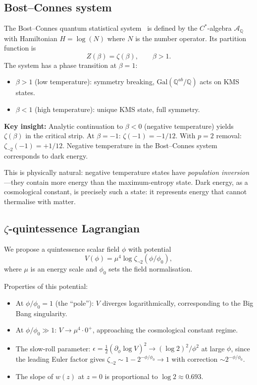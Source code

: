 \documentclass[12pt,a4paper]{article}
\theoremstyle{definition}
\newcommand{\Gal}{\mathrm{Gal}}
\newcommand{\Q}{\mathbb{Q}}
\newcommand{\zetanot}{\zeta_{\neg 2}}
\begin{document}
\subsection{Bost--Connes system}

The Bost--Connes quantum statistical system~\cite{BostConnes} is defined by
the $C^*$-algebra $\mathcal{A}_\Q$ with Hamiltonian $H=\log(N)$ where $N$
is the number operator.  Its partition function is
\[
  Z(\beta)=\zeta(\beta),\qquad \beta>1.
\]
The system has a phase transition at $\beta=1$:
\begin{itemize}
\item $\beta>1$ (low temperature): symmetry breaking, $\Gal(\Q^{ab}/\Q)$ acts
  on KMS states.
\item $\beta<1$ (high temperature): unique KMS state, full symmetry.
\end{itemize}

\textbf{Key insight:} Analytic continuation to $\beta<0$ (negative temperature)
yields $\zeta(\beta)$ in the critical strip.  At $\beta=-1$:
$\zeta(-1)=-1/12$.  With $p=2$ removal: $\zetanot(-1)=+1/12$.
Negative temperature in the Bost--Connes system corresponds to dark energy.

This is physically natural: negative temperature states have \emph{population
inversion}---they contain more energy than the maximum-entropy state.
Dark energy, as a cosmological constant, is precisely such a state:
it represents energy that cannot thermalise with matter.

\subsection{$\zeta$-quintessence Lagrangian}

We propose a quintessence scalar field $\phi$ with potential
\[
  V(\phi)=\mu^4\log\zetanot(\phi/\phi_0),
\]
where $\mu$ is an energy scale and $\phi_0$ sets the field normalisation.

Properties of this potential:
\begin{itemize}
\item At $\phi/\phi_0=1$ (the ``pole''): $V$ diverges logarithmically,
  corresponding to the Big Bang singularity.
\item At $\phi/\phi_0\gg 1$: $V\to \mu^4\cdot 0^+$, approaching the cosmological
  constant regime.
\item The slow-roll parameter: $\epsilon=\frac{1}{2}(\partial_\phi\log V)^2
  \to (\log 2)^2/\phi^2$ at large $\phi$, since the leading Euler factor
  gives $\zetanot\sim 1-2^{-\phi/\phi_0}\to 1$ with correction $\sim 2^{-\phi/\phi_0}$.
\item The slope of $w(z)$ at $z=0$ is proportional to $\log 2\approx 0.693$.
\end{itemize}
\end{document}
